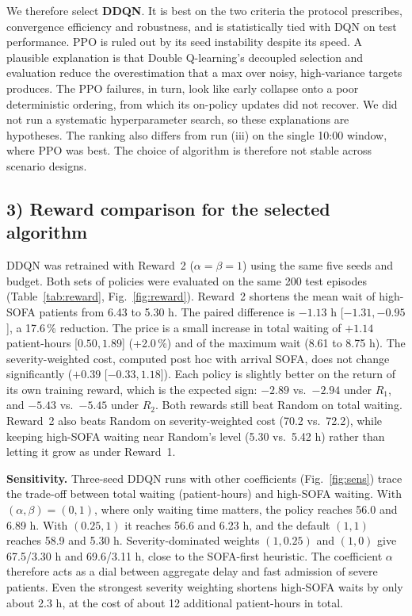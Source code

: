 \documentclass{rlreport}
\begin{document}
We therefore select \textbf{DDQN}. It is best on the two criteria the protocol prescribes, convergence efficiency and robustness, and is statistically tied with DQN on test performance. PPO is ruled out by its seed instability despite its speed. A plausible explanation is that Double Q-learning's decoupled selection and evaluation reduce the overestimation that a max over noisy, high-variance targets produces. The PPO failures, in turn, look like early collapse onto a poor deterministic ordering, from which its on-policy updates did not recover. We did not run a systematic hyperparameter search, so these explanations are hypotheses. The ranking also differs from run (iii) on the single 10:00 window, where PPO was best. The choice of algorithm is therefore not stable across scenario designs.

\subsection*{3) Reward comparison for the selected algorithm}
DDQN was retrained with Reward~2 ($\alpha=\beta=1$) using the same five seeds and budget. Both sets of policies were evaluated on the same 200 test episodes (Table~\ref{tab:reward}, Fig.~\ref{fig:reward}). Reward~2 shortens the mean wait of high-SOFA patients from 6.43 to 5.30 h. The paired difference is $-1.13$ h [$-1.31,-0.95$], a 17.6\,\% reduction. The price is a small increase in total waiting of $+1.14$ patient-hours [$0.50,1.89$] (+2.0\,\%) and of the maximum wait (8.61 to 8.75 h). The severity-weighted cost, computed post hoc with arrival SOFA, does not change significantly ($+0.39$ [$-0.33,1.18$]). Each policy is slightly better on the return of its own training reward, which is the expected sign: $-2.89$ vs.\ $-2.94$ under $R_1$, and $-5.43$ vs.\ $-5.45$ under $R_2$. Both rewards still beat Random on total waiting. Reward~2 also beats Random on severity-weighted cost (70.2 vs.\ 72.2), while keeping high-SOFA waiting near Random's level (5.30 vs.\ 5.42 h) rather than letting it grow as under Reward~1.

\textbf{Sensitivity.} Three-seed DDQN runs with other coefficients (Fig.~\ref{fig:sens}) trace the trade-off between total waiting (patient-hours) and high-SOFA waiting. With $(\alpha,\beta)=(0,1)$, where only waiting time matters, the policy reaches 56.0 and 6.89 h. With $(0.25,1)$ it reaches 56.6 and 6.23 h, and the default $(1,1)$ reaches 58.9 and 5.30 h. Severity-dominated weights $(1,0.25)$ and $(1,0)$ give 67.5/3.30 h and 69.6/3.11 h, close to the SOFA-first heuristic. The coefficient $\alpha$ therefore acts as a dial between aggregate delay and fast admission of severe patients. Even the strongest severity weighting shortens high-SOFA waits by only about 2.3 h, at the cost of about 12 additional patient-hours in total.
\end{document}
